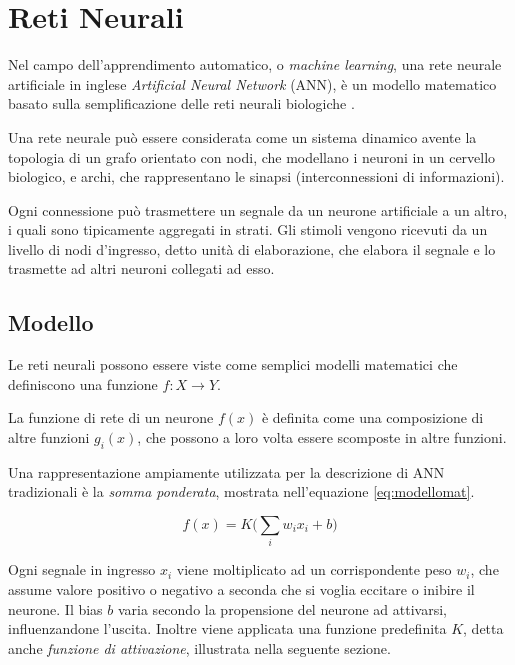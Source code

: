 \chapter{Reti Neurali}
\label{chap:RetiNeurali}

Nel campo dell'apprendimento automatico, o \emph{machine learning}, una rete neurale artificiale  in inglese \emph{Artificial Neural Network} (ANN),  è un modello matematico basato sulla semplificazione delle reti neurali biologiche \cite{samuel1959some}.

Una rete neurale può essere considerata come un sistema dinamico avente la topologia di un grafo orientato con nodi, che modellano i neuroni in un cervello biologico, e archi, che rappresentano le sinapsi (interconnessioni di informazioni).

Ogni connessione può trasmettere un segnale da un neurone artificiale a un altro, i quali sono tipicamente aggregati in strati. Gli stimoli vengono ricevuti da un livello di nodi d'ingresso, detto unità di elaborazione, che elabora il segnale e lo trasmette ad altri neuroni collegati ad esso.

\section{Modello}
\label{sec:modello}

Le reti neurali possono essere viste come semplici modelli matematici che definiscono una funzione $f:X\rightarrow Y$. 

La funzione di rete di un neurone $f(x)$ è definita come una composizione di altre funzioni $g_i(x)$, che possono a loro volta essere scomposte in altre funzioni.

Una rappresentazione ampiamente utilizzata per la descrizione di ANN tradizionali è la \emph{somma ponderata}, mostrata nell'equazione \ref{eq:modellomat}.

\begin{equation}
f(x)=K \bigg( \sum_{i}w_ix_i +b\bigg)
\label{eq:modellomat}
\end{equation}

Ogni segnale in ingresso $x_i$ viene moltiplicato ad un corrispondente peso $w_i$, che assume valore positivo o negativo a seconda che si voglia eccitare o inibire il neurone.  
Il bias $b$ varia secondo la propensione del neurone ad attivarsi, influenzandone l'uscita.
Inoltre viene applicata una funzione predefinita $K$, detta anche \emph{funzione di attivazione}, illustrata nella seguente sezione.

